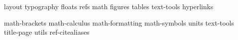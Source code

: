 
\makeatletter
\newcommand{\bragiProvideCommand}[1]{%
    \@ifundefined{\expandafter\@gobble\string#1}{}{%
        \ClassWarningNoLine{bragi}{\string#1\space is already defined elsewhere; keeping the existing definition}%
    }%
    \providecommand#1%
}
\makeatother

{layout}
{typography}
{floats}
{refs}
{math}
{figures}
{tables}
{text-tools}
{hyperlinks} %

{math-brackets}
{math-calculus}
{math-formatting}
{math-symbols}
{units}
{text-tools}
{title-page}
{utils}
{ref-citealiases} %
